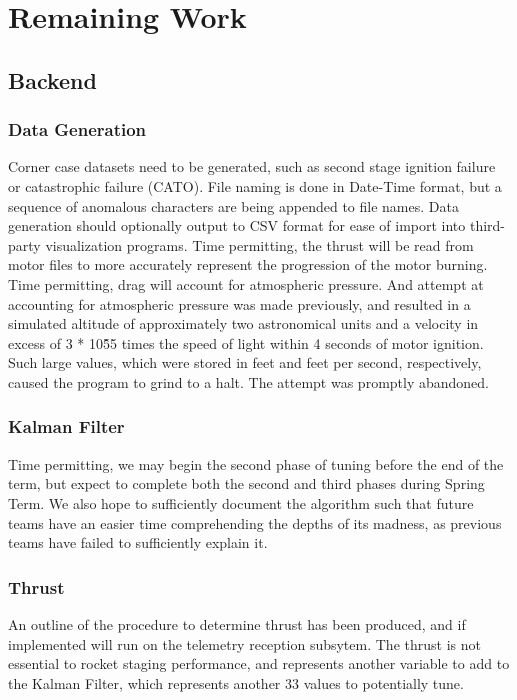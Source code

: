 \documentclass[journal,10pt,onecolumn,compsoc]{IEEEtran}
\begin{document}

\section{Remaining Work}

	\subsection{Backend}
		\subsubsection{Data Generation}
			Corner case datasets need to be generated, such as second stage ignition failure or catastrophic failure (CATO).
			File naming is done in Date-Time format, but a sequence of anomalous characters are being appended to file names.
			Data generation should optionally output to CSV format for ease of import into third-party visualization programs.
			Time permitting, the thrust will be read from motor files to more accurately represent the progression of the motor burning.
			Time permitting, drag will account for atmospheric pressure.
			And attempt at accounting for atmospheric pressure was made previously, and resulted in a simulated altitude of approximately two astronomical units and a velocity in excess of 3 * 10\^55 times the speed of light within 4 seconds of motor ignition.
			Such large values, which were stored in feet and feet per second, respectively, caused the program to grind to a halt.
			The attempt was promptly abandoned.
		\subsubsection{Kalman Filter}
			Time permitting, we may begin the second phase of tuning before the end of the term, but expect to complete both the second and third phases during Spring Term.
			We also hope to sufficiently document the algorithm such that future teams have an easier time comprehending the depths of its madness, as previous teams have failed to sufficiently explain it.
		\subsubsection{Thrust}
			An outline of the procedure to determine thrust has been produced, and if implemented will run on the telemetry reception subsytem.
			The thrust is not essential to rocket staging performance, and represents another variable to add to the Kalman Filter, which represents another 33 values to potentially tune.
\end{document}
